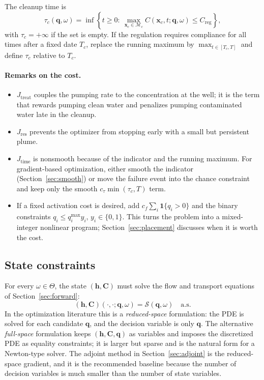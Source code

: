 \documentclass[11pt]{article}
\numberwithin{equation}{section}
\newcommand{\xx}{\mathbf{x}}
\newcommand{\ind}{\mathbf{1}}
\theoremstyle{plain}
\begin{document}
The cleanup time is
\begin{equation}
\label{eq:cleanuptime}
\tau_c(\mathbf{q},\omega)
=\inf\left\{t\ge0:\
\max_{\xx_c\in\mathcal{M}_c}C(\xx_c,t;\mathbf{q},\omega)
\le C_{\mathrm{reg}}\right\},
\end{equation}
with $\tau_c=+\infty$ if the set is empty.  If the regulation requires
compliance for all times after a fixed date $T_c$, replace the running maximum
by $\max_{t\in[T_c,T]}$ and define $\tau_c$ relative to $T_c$.

\paragraph{Remarks on the cost.}
\begin{itemize}[leftmargin=1.6em,itemsep=2pt]
  \item $J_{\mathrm{treat}}$ couples the pumping rate to the concentration at
        the well; it is the term that rewards pumping clean water and
        penalizes pumping contaminated water late in the cleanup.
  \item $J_{\mathrm{res}}$ prevents the optimizer from stopping early with a
        small but persistent plume.
  \item $J_{\mathrm{time}}$ is nonsmooth because of the indicator and the
        running maximum.  For gradient-based optimization, either smooth the
        indicator (Section~\ref{sec:smooth}) or move the failure event into
        the chance constraint and keep only the smooth
        $c_\tau\min(\tau_c,T)$ term.
  \item If a fixed activation cost is desired, add
        $c_f\sum_i\ind\{q_i>0\}$ and the binary constraints
        $q_i\le q_i^{\max}y_i$, $y_i\in\{0,1\}$.  This turns the problem into
        a mixed-integer nonlinear program; Section~\ref{sec:placement}
        discusses when it is worth the cost.
\end{itemize}

\subsection{State constraints}

For every $\omega\in\Theta$, the state $(\mathbf{h},\mathbf{C})$ must solve the
flow and transport equations of Section~\ref{sec:forward}:
\begin{equation}
\label{eq:stateconstraint}
(\mathbf{h},\mathbf{C})(\cdot,\cdot;\mathbf{q},\omega)
=\mathcal{S}(\mathbf{q},\omega)
\quad\text{a.s.}
\end{equation}
In the optimization literature this is a \emph{reduced-space} formulation: the
PDE is solved for each candidate $\mathbf{q}$, and the decision variable is
only $\mathbf{q}$.  The alternative \emph{full-space} formulation keeps
$(\mathbf{h},\mathbf{C},\mathbf{q})$ as variables and imposes the discretized
PDE as equality constraints; it is larger but sparse and is the natural form
for a Newton-type solver.  The adjoint method in Section~\ref{sec:adjoint} is
the reduced-space gradient, and it is the recommended baseline because the
number of decision variables is much smaller than the number of state
variables.
\end{document}
